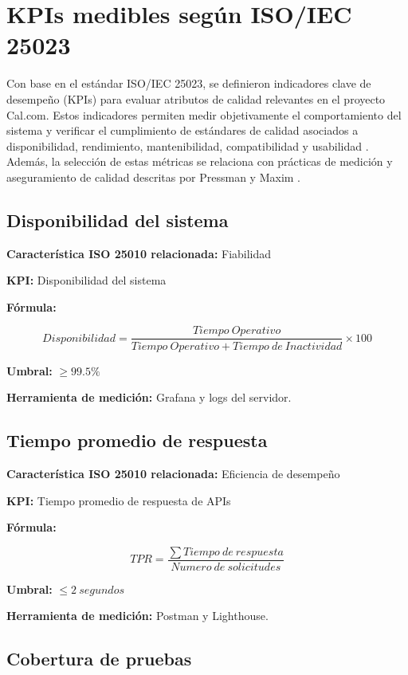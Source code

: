 \documentclass[12pt]{article}
\begin{document}
\section{KPIs medibles según ISO/IEC 25023}

Con base en el estándar ISO/IEC 25023, se definieron indicadores clave de desempeño (KPIs) para evaluar atributos de calidad relevantes en el proyecto Cal.com. Estos indicadores permiten medir objetivamente el comportamiento del sistema y verificar el cumplimiento de estándares de calidad asociados a disponibilidad, rendimiento, mantenibilidad, compatibilidad y usabilidad \cite{iso25023}. Además, la selección de estas métricas se relaciona con prácticas de medición y aseguramiento de calidad descritas por Pressman y Maxim \cite{pressman2020}.

\subsection{Disponibilidad del sistema}

\textbf{Característica ISO 25010 relacionada:} Fiabilidad

\textbf{KPI:} Disponibilidad del sistema

\textbf{Fórmula:}

\[
Disponibilidad = \frac{Tiempo\ Operativo}{Tiempo\ Operativo + Tiempo\ de\ Inactividad} \times 100
\]

\textbf{Umbral:} $\geq 99.5\%$

\textbf{Herramienta de medición:} Grafana y logs del servidor.

\subsection{Tiempo promedio de respuesta}

\textbf{Característica ISO 25010 relacionada:} Eficiencia de desempeño

\textbf{KPI:} Tiempo promedio de respuesta de APIs

\textbf{Fórmula:}

\[
TPR = \frac{\sum Tiempo\ de\ respuesta}{Numero\ de\ solicitudes}
\]

\textbf{Umbral:} $\leq 2\ segundos$

\textbf{Herramienta de medición:} Postman y Lighthouse.

\subsection{Cobertura de pruebas}
\end{document}
